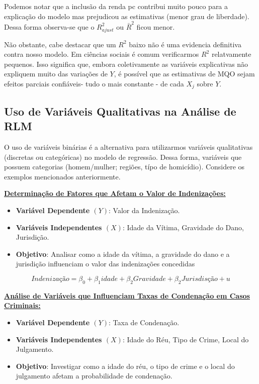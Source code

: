 \documentclass[
  letterpaper,
  DIV=11,
  numbers=noendperiod]{scrreprt}
\providecommand{\tightlist}{%
  \setlength{\itemsep}{0pt}\setlength{\parskip}{0pt}}
\begin{document}
Podemos notar que a inclusão da renda pc contribui muito pouco para a
explicação do modelo mas prejudicou as estimativas (menor grau de
liberdade). Dessa forma observa-se que o \(R^2_{ajust}\) ou
\(\bar{R}^2\) ficou menor.

Não obstante, cabe destacar que um \(R^2\) baixo não é uma evidencia
definitiva contra nosso modelo. Em ciências sociais é comum verificarmos
\(R^2\) relatvamente pequenos. Isso significa que, embora coletivamente
as variáveis explicativas não expliquem muito das variações de \(Y\), é
possível que as estimativas de MQO sejam efeitos parciais confiáveis-
tudo o mais constante - de cada \(X_j\) sobre \(Y\).

\subsection{Uso de Variáveis Qualitativas na Análise de
RLM}\label{uso-de-variuxe1veis-qualitativas-na-anuxe1lise-de-rlm}

O uso de variáveis binárias é a alternativa para utilizarmos variáveis
qualitativas (discretas ou categóricas) no modelo de regressão. Dessa
forma, variáveis que possuem categorias (homem/mulher; regiões, típo de
homicídio). Considere os exemplos mencionados anteriormente.

\ul{\textbf{Determinação de Fatores que Afetam o Valor de
Indenizações:}}

\begin{itemize}
\tightlist
\item
  \textbf{Variável Dependente \((Y)\)}: Valor da Indenização.
\item
  \textbf{Variáveis Independentes \((X)\)}: Idade da Vítima, Gravidade
  do Dano, Jurisdição.
\item
  \textbf{Objetivo}: Analisar como a idade da vítima, a gravidade do
  dano e a jurisdição influenciam o valor das indenizações concedidas
\end{itemize}

\[Indenização = \beta_0 + \beta_1 idade+ \beta_2 Gravidade + \beta_2 Jurisdisção + u\]

\ul{\textbf{Análise de Variáveis que Influenciam Taxas de Condenação em
Casos Criminais:}}

\begin{itemize}
\tightlist
\item
  \textbf{Variável Dependente \((Y)\)}: Taxa de Condenação.
\item
  \textbf{Variáveis Independentes \((X)\)}: Idade do Réu, Tipo de Crime,
  Local do Julgamento.
\item
  \textbf{Objetivo}: Investigar como a idade do réu, o tipo de crime e o
  local do julgamento afetam a probabilidade de condenação.
\end{itemize}
\end{document}
